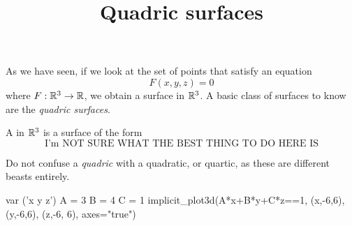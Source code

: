 \documentclass{ximera}
\title[Dig-In:]{Quadric surfaces}
\begin{document}
\begin{abstract}
  
\end{abstract}
\maketitle

As we have seen, if we look at the set of points that satisfy an
equation
\[
F(x,y,z)=0
\]
where $F:\mathbb R^3\to\mathbb R$, we obtain a surface in $\mathbb R^3$. A basic class of
surfaces to know are the \textit{quadric surfaces}.
\begin{definition}
A  in $\mathbb R^3$ is a surface of the form
\[
\text{I'm NOT SURE WHAT THE BEST THING TO DO HERE IS}
\]
\end{definition}

\begin{warning}
  Do not confuse a \textit{quadric} with a quadratic, or quartic, as
  these are different beasts entirely.
\end{warning}

\begin{sageCell}
var ('x y z')
A = 3
B = 4
C = 1
implicit_plot3d(A*x+B*y+C*z==1,
                (x,-6,6), 
                (y,-6,6), 
                (z,-6, 6), 
                axes="true")
\end{sageCell}
\end{document}
